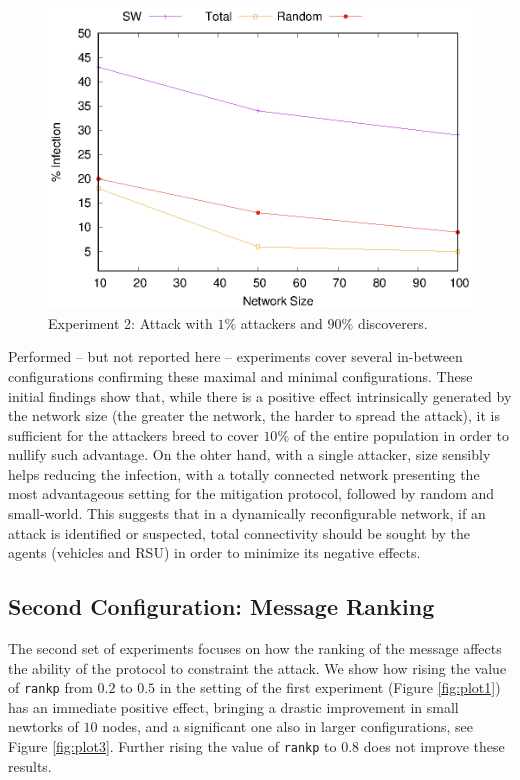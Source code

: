 \documentclass[compsoc, conference, letterpaper, 10pt, times]{IEEEtran}
\begin{document}
\begin{figure}
\includegraphics[scale=0.70]{1stconfig_1_90}
\caption{Experiment 2: Attack with $1\%$ attackers and $90\%$ discoverers.}\label{fig:plot2}
\end{figure}
Performed -- but not reported here -- experiments cover several in-between configurations confirming these maximal and minimal configurations. These initial findings show that, while there is a positive effect intrinsically generated by the network size (the greater the network, the harder to spread the attack), it is sufficient for the attackers breed to cover $10\%$ of the entire population in order to nullify such advantage. On the ohter hand, with a single attacker, size sensibly helps reducing the infection, with a totally connected network presenting the most advantageous setting for the mitigation protocol, followed by random and small-world. This suggests that in a dynamically reconfigurable network, if an attack is identified or suspected, total connectivity should be sought by the agents (vehicles and RSU) in order to minimize its negative effects.

\subsection{Second Configuration: Message Ranking}

The second set of experiments focuses on how the ranking of the message affects the ability of the protocol to constraint the attack. We show how rising the value of \texttt{rankp} from $0.2$ to $0.5$ in the setting of the first experiment (Figure \ref{fig:plot1}) has an immediate positive effect, bringing a drastic improvement in small newtorks of $10$ nodes, and a significant one also in larger configurations, see Figure \ref{fig:plot3}. Further rising the value of \texttt{rankp} to $0.8$ does not improve these results.
\end{document}

